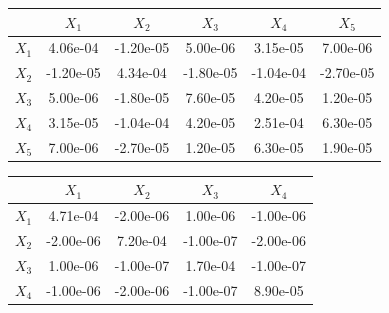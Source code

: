 \documentclass{article}
\begin{document}
\begin{enumerate}
\begin{enumerate}
\begin{figure}[htbp]
\begin{minipage}{0.5\textwidth}
        \centering
        \begin{tabular}{|c|c c c c c|}
            \hline
            & $X_1$ & $X_2$ & $X_3$ & $X_4$ & $X_5$ \\
            \hline
            $X_1$ & 4.06e-04 & -1.20e-05 & 5.00e-06 & 3.15e-05 & 7.00e-06 \\
            $X_2$ & -1.20e-05 & 4.34e-04 & -1.80e-05 & -1.04e-04 & -2.70e-05 \\
            $X_3$ & 5.00e-06 & -1.80e-05 & 7.60e-05 & 4.20e-05 & 1.20e-05 \\
            $X_4$ & 3.15e-05 & -1.04e-04 & 4.20e-05 & 2.51e-04 & 6.30e-05 \\
            $X_5$ & 7.00e-06 & -2.70e-05 & 1.20e-05 & 6.30e-05 & 1.90e-05 \\
            \hline
        \end{tabular}

        \begin{tabular}{|c|c c c c|}
            \hline
            & $X_1$ & $X_2$ & $X_3$ & $X_4$ \\
            \hline
            $X_1$ & 4.71e-04 & -2.00e-06 & 1.00e-06 & -1.00e-06 \\
            $X_2$ & -2.00e-06 & 7.20e-04 & -1.00e-07 & -2.00e-06 \\
            $X_3$ & 1.00e-06 & -1.00e-07 & 1.70e-04 & -1.00e-07 \\
            $X_4$ & -1.00e-06 & -2.00e-06 & -1.00e-07 & 8.90e-05 \\
            \hline
        \end{tabular}
    \end{minipage}
\end{figure}



\end{enumerate}
\end{enumerate}
\end{document}
